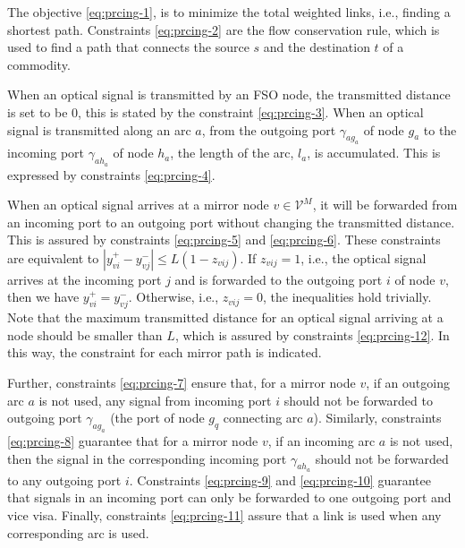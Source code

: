 \documentclass[onecolumn,11pt,draftclsnofoot]{IEEEtran}
\begin{document}
The objective \eqref{eq:prcing-1}, is to minimize the total weighted links, i.e., finding a shortest path. Constraints \eqref{eq:prcing-2} are the flow conservation rule, which is used to find a path that connects the source $s$ and the destination $t$ of a commodity.

When an optical signal is transmitted by an FSO node, the transmitted distance is set to be $0$, this is stated by the constraint \eqref{eq:prcing-3}.
When an optical signal is transmitted along an arc $a$, from the outgoing port $\gamma_{a g_a}$ of node $g_a$ to the incoming port $\gamma_{a h_a}$ of node $h_a$, the length of the arc, $l_a$, is accumulated. This is expressed by constraints \eqref{eq:prcing-4}.

When an optical signal arrives at a mirror node $v \in \mathcal V^M$, it will be forwarded from an incoming port to an outgoing port without changing the transmitted distance. This is assured by constraints \eqref{eq:prcing-5} and \eqref{eq:prcing-6}. These constraints are equivalent to $|y^+_{vi} - y^-_{vj}| \leq L (1-z_{vij})$. If $z_{vij} =1$, i.e., the optical signal arrives at the incoming port $j$  and is forwarded to the outgoing port $i$ of node $v$, then we have $y^+_{vi} = y^-_{vj}$. Otherwise, i.e., $z_{vij} =0$, the inequalities hold trivially.
Note that the maximum transmitted distance for an optical signal arriving at a node should be smaller than $L$, which is assured by constraints \eqref{eq:prcing-12}. In this way, the constraint for each mirror path is indicated.

Further, constraints \eqref{eq:prcing-7} ensure that, for a mirror node $v$, if an outgoing arc $a$ is not used, any signal from incoming port $i$ should not be forwarded to outgoing port $\gamma_{ag_a}$ (the port of node $g_q$ connecting arc $a$). Similarly, constraints \eqref{eq:prcing-8} guarantee that for a mirror node $v$, if an incoming arc $a$ is not used, then the signal in the corresponding incoming port $\gamma_{ah_a}$ should not be forwarded to any outgoing port $i$. Constraints \eqref{eq:prcing-9} and \eqref{eq:prcing-10} guarantee that signals in an incoming port can only be forwarded to one  outgoing port and vice visa.  Finally, constraints \eqref{eq:prcing-11} assure that a link is used when any corresponding arc is used.
\end{document}
